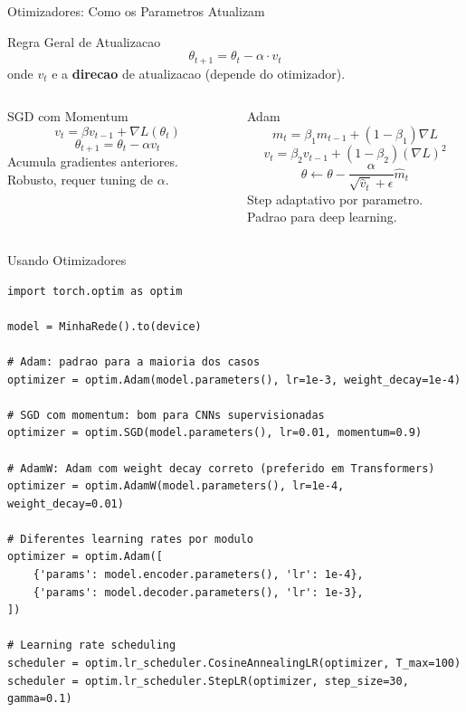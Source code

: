 \documentclass[aspectratio=169, 10pt]{beamer}
\begin{document}

\begin{frame}{Otimizadores: Como os Parametros Atualizam}
\begin{block}{Regra Geral de Atualizacao}
  \[ \theta_{t+1} = \theta_t - \alpha \cdot v_t \]
  onde $v_t$ e a \textbf{direcao} de atualizacao (depende do otimizador).
\end{block}

\vspace{0.4em}
\begin{columns}
\begin{block}{SGD com Momentum}
  \[ v_t = \beta v_{t-1} + \nabla L(\theta_t) \]
  \[ \theta_{t+1} = \theta_t - \alpha v_t \]
  Acumula gradientes anteriores. Robusto, requer tuning de $\alpha$.
\end{block}

\begin{block}{Adam}
  \[ m_t = \beta_1 m_{t-1} + (1-\beta_1)\nabla L \]
  \[ v_t = \beta_2 v_{t-1} + (1-\beta_2)(\nabla L)^2 \]
  \[ \theta \leftarrow \theta - \frac{\alpha}{\sqrt{\hat{v}_t} + \epsilon}\hat{m}_t \]
  Step adaptativo por parametro. Padrao para deep learning.
\end{block}
\end{columns}
\end{frame}


\begin{frame}[fragile]{Usando Otimizadores}
\begin{lstlisting}
import torch.optim as optim

model = MinhaRede().to(device)

# Adam: padrao para a maioria dos casos
optimizer = optim.Adam(model.parameters(), lr=1e-3, weight_decay=1e-4)

# SGD com momentum: bom para CNNs supervisionadas
optimizer = optim.SGD(model.parameters(), lr=0.01, momentum=0.9)

# AdamW: Adam com weight decay correto (preferido em Transformers)
optimizer = optim.AdamW(model.parameters(), lr=1e-4, weight_decay=0.01)

# Diferentes learning rates por modulo
optimizer = optim.Adam([
    {'params': model.encoder.parameters(), 'lr': 1e-4},
    {'params': model.decoder.parameters(), 'lr': 1e-3},
])

# Learning rate scheduling
scheduler = optim.lr_scheduler.CosineAnnealingLR(optimizer, T_max=100)
scheduler = optim.lr_scheduler.StepLR(optimizer, step_size=30, gamma=0.1)
\end{lstlisting}
\end{frame}
\end{document}
